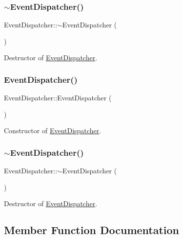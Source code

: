 \subsubsection{\texorpdfstring{$\sim$\+Event\+Dispatcher()}{~EventDispatcher()}\hspace{0.1cm}{\footnotesize\ttfamily [1/2]}}
{\footnotesize\ttfamily Event\+Dispatcher\+::$\sim$\+Event\+Dispatcher (\begin{DoxyParamCaption}{ }\end{DoxyParamCaption})}

Destructor of \hyperlink{classEventDispatcher}{Event\+Dispatcher}. \mbox{\label{classEventDispatcher_aec174a9e25796e5727e59f5452817cda}} 
\subsubsection{\texorpdfstring{Event\+Dispatcher()}{EventDispatcher()}\hspace{0.1cm}{\footnotesize\ttfamily [2/2]}}
{\footnotesize\ttfamily Event\+Dispatcher\+::\+Event\+Dispatcher (\begin{DoxyParamCaption}{ }\end{DoxyParamCaption})}

Constructor of \hyperlink{classEventDispatcher}{Event\+Dispatcher}. \mbox{\label{classEventDispatcher_abb5f401014e87f03027d6c4450964e55}} 
\subsubsection{\texorpdfstring{$\sim$\+Event\+Dispatcher()}{~EventDispatcher()}\hspace{0.1cm}{\footnotesize\ttfamily [2/2]}}
{\footnotesize\ttfamily Event\+Dispatcher\+::$\sim$\+Event\+Dispatcher (\begin{DoxyParamCaption}{ }\end{DoxyParamCaption})}

Destructor of \hyperlink{classEventDispatcher}{Event\+Dispatcher}. 

\subsection{Member Function Documentation}
\mbox{\label{classEventDispatcher_a34c423b6f80a3563bb9399f52b0479b5}} 
